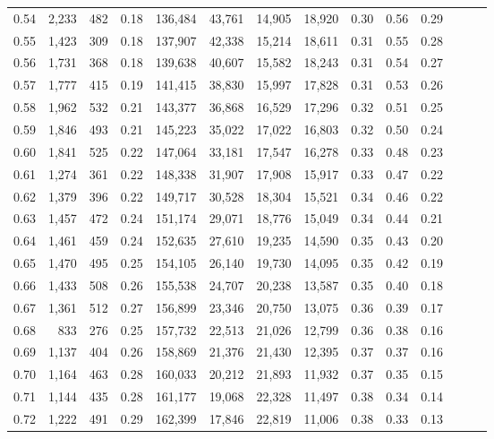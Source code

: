 \begin{tabular}{rrrrrrrrrrrrrr}
0.54 &  2,233 &  482 &  0.18 &  136,484 &   43,761 &  14,905 &  18,920 &  0.30 &  0.56 &      0.29 \\
0.55 &  1,423 &  309 &  0.18 &  137,907 &   42,338 &  15,214 &  18,611 &  0.31 &  0.55 &      0.28 \\
0.56 &  1,731 &  368 &  0.18 &  139,638 &   40,607 &  15,582 &  18,243 &  0.31 &  0.54 &      0.27 \\
0.57 &  1,777 &  415 &  0.19 &  141,415 &   38,830 &  15,997 &  17,828 &  0.31 &  0.53 &      0.26 \\
0.58 &  1,962 &  532 &  0.21 &  143,377 &   36,868 &  16,529 &  17,296 &  0.32 &  0.51 &      0.25 \\
0.59 &  1,846 &  493 &  0.21 &  145,223 &   35,022 &  17,022 &  16,803 &  0.32 &  0.50 &      0.24 \\
0.60 &  1,841 &  525 &  0.22 &  147,064 &   33,181 &  17,547 &  16,278 &  0.33 &  0.48 &      0.23 \\
0.61 &  1,274 &  361 &  0.22 &  148,338 &   31,907 &  17,908 &  15,917 &  0.33 &  0.47 &      0.22 \\
0.62 &  1,379 &  396 &  0.22 &  149,717 &   30,528 &  18,304 &  15,521 &  0.34 &  0.46 &      0.22 \\
0.63 &  1,457 &  472 &  0.24 &  151,174 &   29,071 &  18,776 &  15,049 &  0.34 &  0.44 &      0.21 \\
0.64 &  1,461 &  459 &  0.24 &  152,635 &   27,610 &  19,235 &  14,590 &  0.35 &  0.43 &      0.20 \\
0.65 &  1,470 &  495 &  0.25 &  154,105 &   26,140 &  19,730 &  14,095 &  0.35 &  0.42 &      0.19 \\
0.66 &  1,433 &  508 &  0.26 &  155,538 &   24,707 &  20,238 &  13,587 &  0.35 &  0.40 &      0.18 \\
0.67 &  1,361 &  512 &  0.27 &  156,899 &   23,346 &  20,750 &  13,075 &  0.36 &  0.39 &      0.17 \\
0.68 &    833 &  276 &  0.25 &  157,732 &   22,513 &  21,026 &  12,799 &  0.36 &  0.38 &      0.16 \\
0.69 &  1,137 &  404 &  0.26 &  158,869 &   21,376 &  21,430 &  12,395 &  0.37 &  0.37 &      0.16 \\
0.70 &  1,164 &  463 &  0.28 &  160,033 &   20,212 &  21,893 &  11,932 &  0.37 &  0.35 &      0.15 \\
0.71 &  1,144 &  435 &  0.28 &  161,177 &   19,068 &  22,328 &  11,497 &  0.38 &  0.34 &      0.14 \\
0.72 &  1,222 &  491 &  0.29 &  162,399 &   17,846 &  22,819 &  11,006 &  0.38 &  0.33 &      0.13 \\

\end{tabular}
